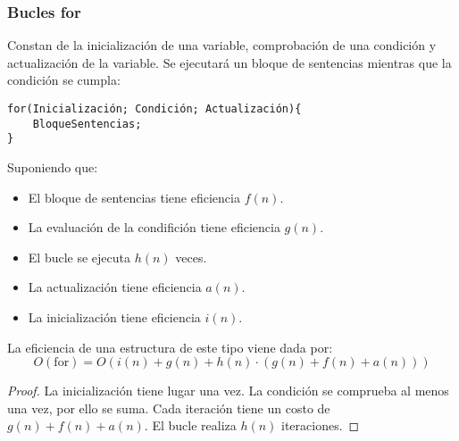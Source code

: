 \subsubsection{Bucles for}
Constan de la inicialización de una variable, comprobación de una condición y actualización de la variable. Se ejecutará un bloque de sentencias mientras que la condición se cumpla:
\begin{listing}[H]
\begin{verbatim}
for(Inicialización; Condición; Actualización){
    BloqueSentencias;
}
\end{verbatim}
\end{listing}

Suponiendo que:
\begin{itemize}
\item El bloque de sentencias tiene eficiencia $f(n)$.
\item La evaluación de la condifición tiene eficiencia $g(n)$.
\item El bucle se ejecuta $h(n)$ veces.
\item La actualización tiene eficiencia $a(n)$.
\item La inicialización tiene eficiencia $i(n)$.
\end{itemize}

La eficiencia de una estructura de este tipo viene dada por:
\begin{equation*}
O(\mbox{for}) = O(i(n)+g(n) + h(n) \cdot (g(n)+f(n)+a(n)))
\end{equation*}

\begin{proof}
La inicialización tiene lugar una vez.
La condición se comprueba al menos una vez, por ello se suma.  
Cada iteración tiene un costo de $g(n) + f(n) + a(n)$.  
El bucle realiza $h(n)$ iteraciones.
\end{proof}

